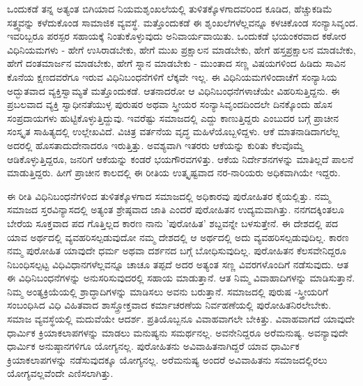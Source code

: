 ಒಂದುಕಡೆ ತನ್ನ ಅತ್ಯಂತ ಬಿಗಿಯಾದ ನಿಯಮಶೃಂಖಲೆಯಲ್ಲಿ ತುಳಿತಕ್ಕೊಳಗಾದವರಿಂದ ಕೂಡಿದ, ಹೆಚ್ಚುಕಡಿಮೆ ಸತ್ತ್ವವನ್ನು ಕಳೆದುಕೊಂಡ ಸಾಮಾಜಿಕ ವ್ಯವಸ್ಥೆ. ಮತ್ತೊಂದುಕಡೆ ಈ ಶೃಂಖಲೆಗಳೆಲ್ಲವನ್ನೂ ಕಳಚಿಕೊಂಡ ಸಂನ್ಯಾಸಿವೃಂದ. ಇವರಿಬ್ಬರೂ ಪರಸ್ಪರ ಸಹಾಯಕ್ಕೆ ನಿಂತುಕೊಳ್ಳುವುದು ಅನಿವಾರ್ಯವಾಯಿತು. ಒಂದುಕಡೆ ಭಯಂಕರವಾದ ಕಠೋರ ವಿಧಿನಿಯಮಗಳು - ಹೇಗೆ ಉಸಿರಾಡಬೇಕು, ಹೇಗೆ ಮುಖ ಪ್ರಕ್ಷಾಲನ ಮಾಡಬೇಕು, ಹೇಗೆ ಹಸ್ತಪ್ರಕ್ಷಾಲನ ಮಾಡಬೇಕು, ಹೇಗೆ ದಂತಮಾರ್ಜನ ಮಾಡಬೇಕು, ಹೇಗೆ ಸ್ನಾನ ಮಾಡಬೇಕು - ಮುಂತಾದ ಸಣ್ಣ ವಿಷಯಗಳಿಂದ ಹಿಡಿದು ಸಾವಿನ ಕೊನೆಯ ಕ್ಷಣದವರೆಗೂ ಇರುವ ವಿಧಿನಿಬಂಧನೆಗಳಿಗೆ ಲೆಕ್ಕವೇ ಇಲ್ಲ. ಈ ವಿಧಿನಿಯಮಗಳಿಂದಾಚೆಗೆ ಸಂನ್ಯಾಸಿಯ ಅದ್ಭುತವಾದ ವ್ಯಕ್ತಿಸ್ವಾಮ್ಯತೆ ಮತ್ತೊಂದುಕಡೆ. ಆತನಾದರೋ ಆ ವಿಧಿನಿಬಂಧನೆಗಳಾಚೆಯೇ ವಿಹರಿಸುತ್ತಿದ್ದನು. ಈ ಪ್ರಬಲವಾದ ವ್ಯಕ್ತಿ ಸ್ವಾಧೀನತೆಯುಳ್ಳ ಪುರುಷರ ಅಥವಾ ಸ್ತ್ರೀಯರ ಸಂನ್ಯಾಸಿವೃಂದದಿಂದಲೇ ದಿನಕ್ಕೊಂದು ಹೊಸ ಸಂಪ್ರದಾಯಗಳು ಹುಟ್ಟಿಕೊಳ್ಳುತ್ತಿದ್ದುವು. ಇವರೆಷ್ಟು ಸಮಾಜದಲ್ಲಿ ಎದ್ದು ಕಾಣುತ್ತಿದ್ದರು ಎಂಬುದರ ಬಗ್ಗೆ ಪ್ರಾಚೀನ ಸಂಸ್ಕೃತ ಸಾಹಿತ್ಯದಲ್ಲಿ ಉಲ್ಲೇಖವಿದೆ. ವಿಚಿತ್ರ ವರ್ತನೆಯ ವೃದ್ಧ ಮಹಿಳೆಯೊಬ್ಬಳಿದ್ದಳು. ಆಕೆ ಮಾತನಾಡಿದಾಗಲೆಲ್ಲ ಅದರಲ್ಲಿ ಹೊಸತಾದುದೇನಾದರೂ ಇರುತ್ತಿತ್ತು. ಅವಶ್ಯವಾಗಿ ಇತರರು ಆಕೆಯನ್ನು ಕುರಿತು ಕೆಲವೊಮ್ಮೆ ಆಡಿಕೊಳ್ಳುತ್ತಿದ್ದರೂ, ಜನರಿಗೆ ಆಕೆಯನ್ನು ಕಂಡರೆ ಭಯಗೌರವಗಳಿತ್ತು. ಆಕೆಯ ನಿರ್ದೇಶನಗಳನ್ನು ಮಾತಿಲ್ಲದೆ ಪಾಲನೆ ಮಾಡುತ್ತಿದ್ದರು. ಹೀಗೆ ಪ್ರಾಚೀನ ಕಾಲದಲ್ಲಿ ಈ ರೀತಿಯ ಉತ್ಕೃಷ್ಟವಾದ ನರ-ನಾರಿಯರು ಅಧಿಕವಾಗಿಯೇ ಇದ್ದರು.

ಈ ರೀತಿ ವಿಧಿನಿಬಂಧನೆಗಳಿಂದ ತುಳಿತಕ್ಕೊಳಗಾದ ಸಮಾಜದಲ್ಲಿ ಅಧಿಕಾರವು ಪುರೋಹಿತರ ಕೈಯಲ್ಲಿತ್ತು. ನಮ್ಮ ಸಮಾಜದ ಸ್ತರವಿನ್ಯಾಸದಲ್ಲಿ ಅತ್ಯಂತ ಶ್ರೇಷ್ಠವಾದ ಜಾತಿ ಎಂದರೆ ಪುರೋಹಿತನ ಉದ್ಯಮವಾಗಿತ್ತು. ನನಗದಕ್ಕಿಂತಲೂ ಬೇರೆಯ ಸೂಕ್ತವಾದ ಪದ ಗೊತ್ತಿಲ್ಲದ ಕಾರಣ ನಾನು 'ಪುರೋಹಿತ' ಶಬ್ದವನ್ನೇ ಬಳಸುತ್ತೇನೆ. ಈ ದೇಶದಲ್ಲಿ  ಪದ ಯಾವ ಅರ್ಥದಲ್ಲಿ ವ್ಯವಹರಿಸಲ್ಪಡುವುದೋ ನಮ್ಮ ದೇಶದಲ್ಲಿ ಆ ಅರ್ಥದಲ್ಲಿ ಅದು ವ್ಯವಹರಿಸಲ್ಪಡುವುದಿಲ್ಲ. ಕಾರಣ ನಮ್ಮ ಪುರೋಹಿತ ಯಾವುದೇ ಧರ್ಮ ಅಥವಾ ದರ್ಶನದ ಬಗ್ಗೆ ಬೋಧಿಸುವುದಿಲ್ಲ. ಪುರೋಹಿತನ ಕೆಲಸವೇನಿದ್ದರೂ ನಿಬಂಧಿಸಲ್ಪಟ್ಟ ವಿಧಿವಿಧಾನಗಳೆಲ್ಲವನ್ನೂ ಚಾಚೂ ತಪ್ಪದೆ ಅದರ ಅತ್ಯಂತ ಸಣ್ಣ ವಿವರಗಳೊಂದಿಗೆ ನಡೆಸುವುದು. ಆತ ಈ ವಿಧಿನಿಬಂಧನೆಗಳನ್ನು ಅನುಸರಿಸುವುದರಲ್ಲಿ ಸಹಾಯ ಮಾಡುತ್ತಾನೆ. ಆತ ನಿಮ್ಮ ವಿವಾಹಾದಿಗಳನ್ನು ಮಾಡಿಸುತ್ತಾನೆ. ನಿಮ್ಮ ಅಂತ್ಯಕ್ರಿಯೆಯಲ್ಲಿ ಶ್ರಾದ್ಧಾದಿಗಳನ್ನು ಮಾಡಿಸಲು ಅವನು ಬರುತ್ತಾನೆ. ಸಮಾಜದಲ್ಲಿ ಪುರುಷ -ಸ್ತ್ರೀಯರಿಗೆ ಸಂಬಂಧಿಸಿದ ವಿಧಿ ವಿಹಿತವಾದ ಶಾಸ್ತ್ರೋಕ್ತವಾದ ಕರ್ಮಾಚರಣೆಯ ನಿರ್ವಹಣೆಯಲ್ಲಿ ಪುರೋಹಿತನಿರಲೇಬೇಕು. ಸಮಾಜ ವ್ಯವಸ್ಥೆಯಲ್ಲಿ ಮದುವೆಯೇ ಆದರ್ಶ. ಪ್ರತಿಯೊಬ್ಬನೂ ವಿವಾಹವಾಗಲೇ ಬೇಕಿತ್ತು. ವಿವಾಹವಾಗದೆ ಯಾವುದೇ ಧಾರ್ಮಿಕ ಕ್ರಿಯಾಕಲಾಪಗಳನ್ನು ಮಾಡಲು ಮನುಷ್ಯನು ಸಮರ್ಥನಲ್ಲ. ಅವನೇನಿದ್ದರೂ ಅರೆಮನುಷ್ಯ. ಅವನ್ಯಾವುದೇ ಧಾರ್ಮಿಕ ಅನುಷ್ಠಾನಗಳಿಗೂ ಯೋಗ್ಯನಲ್ಲ. ಪುರೋಹಿತನು ಅವಿವಾಹಿತನಾಗಿದ್ದರೆ ಯಾವ ಧಾರ್ಮಿಕ ಕ್ರಿಯಾಕಲಾಪಗಳನ್ನು ನಡೆಸುವುದಕ್ಕೂ ಯೋಗ್ಯನಲ್ಲ. ಅರೆಮನುಷ್ಯ ಅಂದರೆ ಅವಿವಾಹಿತನು ಸಮಾಜದಲ್ಲಿರಲು ಯೋಗ್ಯವಲ್ಲವೆಂದೇ ಎಣಿಸಲಾಗಿತ್ತು.

